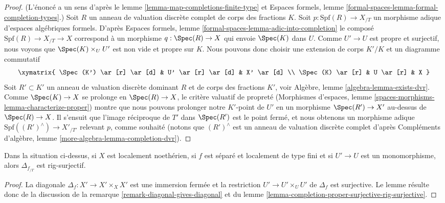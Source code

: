 \begin{proof}
(L'énoncé a un sens d'après le
lemme \ref{lemma-map-completions-finite-type} et
Espaces formels, lemme \ref{formal-spaces-lemma-formal-completion-types}.)
Soit $R$ un anneau de valuation discrète complet de corps des fractions $K$.
Soit $p : \text{Spf}(R) \to X_{/T}$ un morphisme adique d'espaces
algébriques formels. D'après Espaces formels, lemme
\ref{formal-spaces-lemma-adic-into-completion}
le composé $\text{Spf}(R) \to X_{/T} \to X$
correspond à un morphisme $q : \Spec(R) \to X$
qui envoie $\Spec(K)$ dans $U$. Comme $U' \to U$ est propre et surjectif,
nous voyons que $\Spec(K) \times_U U'$ est non vide et propre sur $K$.
Nous pouvons donc choisir une extension de corps $K'/K$ et un diagramme
commutatif
$$
\xymatrix{
\Spec(K') \ar[r] \ar[d] & U' \ar[r] \ar[d] & X' \ar[d] \\
\Spec(K) \ar[r] & U \ar[r] & X
}
$$
Soit $R' \subset K'$ un anneau de valuation discrète dominant $R$ et de
corps des fractions $K'$, voir Algèbre, lemme \ref{algebra-lemma-exists-dvr}.
Comme $\Spec(K) \to X$ se prolonge en $\Spec(R) \to X$, le critère valuatif
de propreté (Morphismes d'espaces, lemme
\ref{spaces-morphisms-lemma-characterize-proper}) montre que nous pouvons
prolonger notre $K'$-point de $U'$ en un morphisme
$\Spec(R') \to X'$ au-dessus de $\Spec(R) \to X$.
Il s'ensuit que l'image réciproque de $T'$ dans $\Spec(R')$ est le
point fermé, et nous obtenons un morphisme adique
$\text{Spf}((R')^\wedge) \to X'_{/T'}$ relevant $p$,
comme souhaité (notons que $(R')^\wedge$ est un anneau de valuation discrète
complet d'après Compléments d'algèbre, lemme
\ref{more-algebra-lemma-completion-dvr}).
\end{proof}

\begin{lemma}
\label{lemma-separated-mono-open-diagonal-rig-surjective}
Dans la situation ci-dessus, si $X$ est localement noethérien,
si $f$ est séparé et localement de type fini et si $U' \to U$ est
un monomorphisme, alors $\Delta_{f_{/T}}$ est rig-surjectif.
\end{lemma}

\begin{proof}
La diagonale $\Delta_f : X' \to X' \times_X X'$ est une immersion
fermée et la restriction $U' \to U' \times_U U'$ de $\Delta_f$
est surjective. Le lemme résulte donc de la discussion de la
remarque \ref{remark-diagonal-gives-diagonal} et du
lemme \ref{lemma-completion-proper-surjective-rig-surjective}.
\end{proof}












